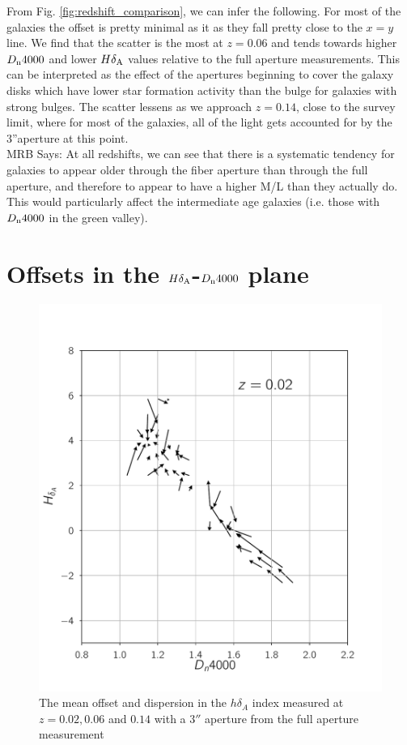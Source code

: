 From Fig. \ref{fig:redshift_comparison}, we can infer the following. For most of the galaxies the offset is pretty minimal as it as they fall pretty close to the $x=y$ line. We find that the scatter is the most at $z = 0.06$ and tends towards higher $D_{\rm n}4000$ and lower $H\delta_{\rm A}$ values relative to the full aperture measurements. This can be interpreted as the effect of the apertures beginning to cover the galaxy disks which have lower star formation activity than the bulge for galaxies with strong bulges. The scatter lessens as we approach $z = 0.14$, close to the survey limit, where for most of the galaxies, all of the light gets accounted for by the 3''aperture at this point.\\

MRB Says: At all redshifts, we can see that there is a systematic tendency for galaxies to appear older through the fiber aperture than through the full aperture, and therefore to appear to have a higher M/L than they actually do. This would particularly affect the intermediate age galaxies (i.e. those with $D_{\rm n}4000$ in the green valley).\\



\section{Offsets in the $H\delta_{\rm A}$-$D_{\rm n}4000$ plane}

\begin{figure}
\includegraphics[width=\textwidth]{figures/quiver_a.pdf}
\caption[Short figure name.]{ The mean offset and dispersion in the $h\delta_{A}$ index measured at $z = 0.02,0.06$ and $0.14$ with a $3''$ aperture from the full aperture measurement 
\label{fig:myInlineFigure}}
\end{figure}

